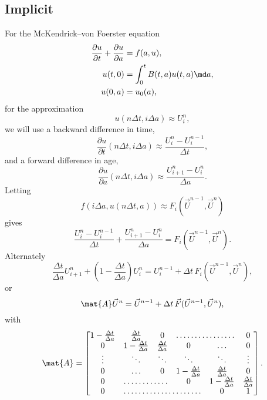 \documentclass{jpmarticle}
\begin{document}
\subsection{Implicit}

For the McKendrick--von Foerster equation
\begin{equation}
  \begin{split}
    \frac{\partial u}{\partial t} + \frac{\partial u}{\partial a}
    &= f(a, u),
    \\
    u(t, 0) &= \int_0^t B(t, a) u(t, a) \md a,
    \\
    u(0, a) &= u_0(a),
  \end{split}
\end{equation}
for the approximation
\begin{equation}
  u(n \Delta t, i \Delta a) \approx U_i^n,
\end{equation}
we will use a backward difference in time,
\begin{equation}
  \frac{\partial u}{\partial t} (n \Delta t, i \Delta a)
  \approx
  \frac{U^n_i - U^{n - 1}_i}{\Delta t},
\end{equation}
and a forward difference in age,
\begin{equation}
  \frac{\partial u}{\partial a} (n \Delta t, i \Delta a)
  \approx
  \frac{U^n_{i + 1} - U^n_i}{\Delta a}.
\end{equation}
Letting
\begin{equation}
  f\left(i \Delta a, u(n \Delta t, a)\right)
  \approx F_i(\vec{U}^{n - 1}, \vec{U}^n)
\end{equation}
gives
\begin{equation}
  \frac{U^n_i - U^{n - 1}_i}{\Delta t}
  +
  \frac{U^n_{i + 1} - U^n_i}{\Delta a}
  = F_i(\vec{U}^{n - 1}, \vec{U}^n).
\end{equation}
Alternately
\begin{equation}
  \frac{\Delta t}{\Delta a} U^n_{i + 1}
  +
  \left(1 - \frac{\Delta t}{\Delta a}\right)
  U^n_i
  =
  U^{n - 1}_i + \Delta t \, F_i(\vec{U}^{n - 1}, \vec{U}^n),
\end{equation}
or
\begin{equation}
  \mat{A} \vec{U}^n
  =
  \vec{U}^{n - 1} + \Delta t \, \vec{F}(\vec{U}^{n - 1}, \vec{U}^n),
\end{equation}
with
\begin{equation}
  \mat{A} =
  \begin{bmatrix}
    1 - \frac{\Delta t}{\Delta a} & \frac{\Delta t}{\Delta a} & 0
    & \hdotsfor{2} & 0
    \\
    0 & 1 - \frac{\Delta t}{\Delta a} & \frac{\Delta t}{\Delta a}
    & 0 & \hdots & 0
    \\
    \vdots & \ddots & \ddots & \ddots & \ddots & \vdots
    \\
    0 & \hdots & 0 & 1 - \frac{\Delta t}{\Delta a} &
    \frac{\Delta t}{\Delta a} & 0
    \\
    0 & \hdotsfor{2} & 0 & 1 - \frac{\Delta t}{\Delta a} & \frac{\Delta t}{\Delta a}
    \\
    0 & \hdotsfor{3} & 0 & 1
  \end{bmatrix}.
\end{equation}
\end{document}
